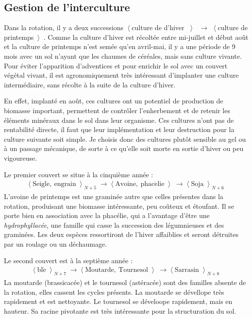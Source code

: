 \documentclass{book}
\begin{document}
\subsection{Gestion de l'interculture}

Dans la rotation, il y a deux successions $\left\langle \right. $culture de d'hiver $\left\rangle \right. $ $\longrightarrow$ $\left\langle \right. $culture de printemps$\left\rangle \right. $. Comme la culture d'hiver est récoltée entre mi-juillet et début août et la culture de printemps n'est semée qu'en avril-mai, il y a une période de 9 mois avec un sol n'ayant que les chaumes de céréales, mais sans culture vivante. Pour éviter l'apparition d'adventices et pour enrichir le sol avec un couvert végétal vivant, il est agronomiquement très intéressant d'implanter une culture intermédiaire, sans récolte à la suite de la culture d'hiver. 

En effet, implanté en août, ces cultures ont un potentiel de production de biomasse important, permettent de contrôler l'enherbement et de retenir les éléments minéraux dans le sol dans leur organisme. Ces cultures n'ont pas de rentabilité directe, il faut que leur implémentation et leur destruction pour la culture suivante soit simple. Je choisis donc des cultures plutôt sensible au gel ou à un passage mécanique, de sorte à ce qu'elle soit morte en sortie d'hiver ou peu vigoureuse. 

Le premier couvert se situe à la cinquième année :
\begin{align*}
\left\langle \right. \mathrm{Seigle,\ engrain}  \left\rangle \right._{N+5}  \longrightarrow \left\langle \right.\mathrm{Avoine,\ phac\acute{e}lie}\left\rangle \right.\longrightarrow \left\langle \right. \mathrm{Soja} \left\rangle \right._{N+6}
\end{align*}
L'avoine de printemps est une graminée autre que celles présentes dans la rotation, produisant une biomasse intéressante, peu coûteux et étoufant. Il se porte bien en association avec la phacélie, qui a l'avantage d'être une \textit{hydrophyllacée}, une famille qui casse la succession des légumnieuses et des graminées. Les deux espèces ressortiront de l'hiver affaiblies et seront détruites par un roulage ou un déchaumage.

Le second couvert est à la septième année :
\begin{align*}
\left\langle \right. \mathrm{bl\acute{e}}  \left\rangle \right._{N+7}  \longrightarrow \left\langle \right.\mathrm{Moutarde,\ Tournesol}\left\rangle \right.\longrightarrow \left\langle \right. \mathrm{Sarrasin} \left\rangle \right. _{N+8}
\end{align*}
La moutarde (brassicacée) et le tournesol (astéracée) sont des familles absente de la rotation, elles cassent les cycles présents. La moutarde se dévellope très rapidement et est nettoyante. Le tournesol se déveloope rapidement, mais en hauteur. Sa racine pivotante est très intéressante pour la structuration du sol.
\end{document}

